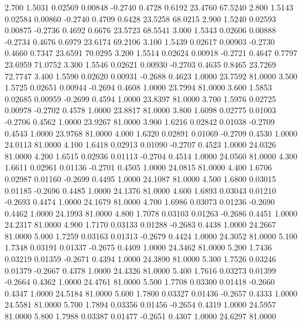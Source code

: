    2.700   1.5031   0.02569   0.00848  -0.2740   0.4728   0.6192  23.4760  67.5240
   2.800   1.5143   0.02584   0.00860  -0.2740   0.4709   0.6428  23.5258  68.0215
   2.900   1.5240   0.02593   0.00875  -0.2736   0.4692   0.6676  23.5723  68.5541
   3.000   1.5343   0.02606   0.00888  -0.2734   0.4676   0.6979  23.6174  69.2106
   3.100   1.5439   0.02617   0.00903  -0.2730   0.4660   0.7347  23.6591  70.0295
   3.200   1.5514   0.02624   0.00918  -0.2721   0.4647   0.7797  23.6959  71.0752
   3.300   1.5546   0.02621   0.00930  -0.2703   0.4635   0.8465  23.7269  72.7747
   3.400   1.5590   0.02620   0.00931  -0.2688   0.4623   1.0000  23.7592  81.0000
   3.500   1.5725   0.02651   0.00944  -0.2694   0.4608   1.0000  23.7994  81.0000
   3.600   1.5853   0.02685   0.00959  -0.2699   0.4594   1.0000  23.8397  81.0000
   3.700   1.5976   0.02725   0.00978  -0.2702   0.4578   1.0000  23.8817  81.0000
   3.800   1.6098   0.02775   0.01003  -0.2706   0.4562   1.0000  23.9267  81.0000
   3.900   1.6216   0.02842   0.01038  -0.2709   0.4543   1.0000  23.9768  81.0000
   4.000   1.6320   0.02891   0.01069  -0.2709   0.4530   1.0000  24.0113  81.0000
   4.100   1.6418   0.02913   0.01090  -0.2707   0.4523   1.0000  24.0326  81.0000
   4.200   1.6515   0.02936   0.01113  -0.2704   0.4514   1.0000  24.0560  81.0000
   4.300   1.6611   0.02961   0.01136  -0.2701   0.4505   1.0000  24.0815  81.0000
   4.400   1.6706   0.02987   0.01160  -0.2699   0.4495   1.0000  24.1087  81.0000
   4.500   1.6800   0.03015   0.01185  -0.2696   0.4485   1.0000  24.1376  81.0000
   4.600   1.6893   0.03043   0.01210  -0.2693   0.4474   1.0000  24.1679  81.0000
   4.700   1.6986   0.03073   0.01236  -0.2690   0.4462   1.0000  24.1993  81.0000
   4.800   1.7078   0.03103   0.01263  -0.2686   0.4451   1.0000  24.2317  81.0000
   4.900   1.7170   0.03133   0.01288  -0.2683   0.4438   1.0000  24.2667  81.0000
   5.000   1.7259   0.03163   0.01313  -0.2679   0.4424   1.0000  24.3052  81.0000
   5.100   1.7348   0.03191   0.01337  -0.2675   0.4409   1.0000  24.3462  81.0000
   5.200   1.7436   0.03219   0.01359  -0.2671   0.4394   1.0000  24.3890  81.0000
   5.300   1.7526   0.03246   0.01379  -0.2667   0.4378   1.0000  24.4326  81.0000
   5.400   1.7616   0.03273   0.01399  -0.2664   0.4362   1.0000  24.4761  81.0000
   5.500   1.7708   0.03300   0.01418  -0.2660   0.4347   1.0000  24.5184  81.0000
   5.600   1.7800   0.03327   0.01436  -0.2657   0.4333   1.0000  24.5581  81.0000
   5.700   1.7894   0.03356   0.01456  -0.2654   0.4319   1.0000  24.5957  81.0000
   5.800   1.7988   0.03387   0.01477  -0.2651   0.4307   1.0000  24.6297  81.0000

